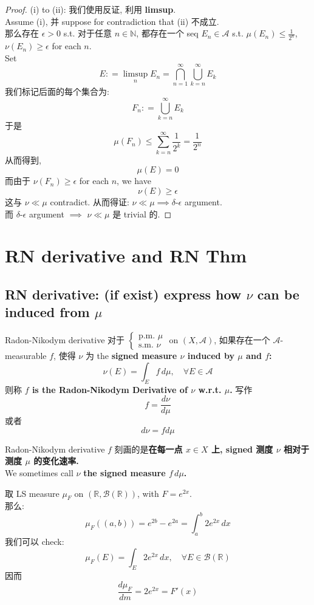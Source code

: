 \documentclass[lang=cn,11pt]{elegantbook}
\begin{document}
\begin{proof}
    (i) to (ii): 我们使用反证, 利用 \textbf{limsup}.\\
    Assume (i), 并 suppose for contradiction that (ii) 不成立.\\
    那么存在 $\epsilon > 0$ s.t. 对于任意 $n \in \mathbb{N}$, 都存在一个 seq $E_n \in \mathcal{A}$ s.t. $\mu(E_n) \leq \frac{1}{2^n}$, $\nu(E_n) \geq \epsilon$ for each $n$.\\
    Set  \[
    E :  = \limsup_n E_n  = \bigcap_{n=1}^\infty \bigcup_{k=n}^\infty E_k
    \]
    我们标记后面的每个集合为: \[
    F_n: = \bigcup_{k=n}^\infty E_k
    \]
    于是 \[
    \mu(F_n) \leq \sum_{k=n}^\infty \frac{1}{2^k} = \frac{1}{2^{n}}
    \]
    从而得到, \[
    \mu(E) = 0
    \]
    而由于 $\nu(F_n) \geq \epsilon$ for each $n$, we have \[
    \nu(E) \geq \epsilon
    \]这与 $\nu \ll \mu$ contradict. 从而得证: $\nu \ll \mu \implies \delta$-$\epsilon$ argument.\\
    而 $\delta$-$\epsilon$ argument $\implies$ $\nu \ll \mu$ 是 trivial 的.
\end{proof}


\section{RN derivative and RN Thm}
\subsection{RN derivative: (if exist) express how $\nu$ can be induced from $\mu$  }
\begin{definition}{Radon-Nikodym derivative}
    对于 \(\begin{cases}
        \text{p.m. } \mu\\
        \text{s.m. } \nu
    \end{cases} \) on $(X,\mathcal{A})$, 如果存在一个 $\mathcal{A}$-measurable $f$, 使得 $\nu$ 为 the \textbf{signed measure $\nu$ induced by $\mu$ and $f$:}  \[
    \nu(E) = \int_E f\, d\mu,\quad \forall E \in \mathcal{A}
    \]
    则称 \textbf{$f$ is the Radon-Nikodym Derivative of $\nu$ w.r.t. $\mu$.} 写作 \[
    f = \frac{d\nu}{d\mu}
    \]或者  \[
    d\nu = f d\mu
    \]
\end{definition}
Radon-Nikodym derivative $f$ 刻画的是\textbf{在每一点 $x\in X$ 上, signed 测度 $\nu$ 相对于测度 $\mu$ 的变化速率.}\\
We sometimes call $\nu$ \textbf{the signed measure $f \, d\mu$.}\\
\begin{example}
 取 LS measure $\mu_F$ on $(\mathbb{R},\mathcal{B}(\mathbb{R}))$, with $F = e^{2x}$.\\
 那么: \[
 \mu_F ((a,b)) = e^{2b}-  e^{2a} = \int_a^b 2e^{2x} \, dx
 \]
 我们可以 check: \[
 \mu_F (E) =  \int_E 2e^{2x} \, dx,\quad \forall E \in \mathcal{B}(\mathbb{R})
 \]
 因而 \[
 \frac{d\mu_F}{dm} = 2e^{2x} = F'(x)
 \]
\end{example}
\end{document}
